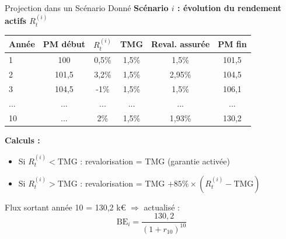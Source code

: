 \documentclass[10pt,aspectratio=169]{beamer}
\newcommand{\BE}{\text{BE}}
\begin{document}
\begin{frame}{Projection dans un Scénario Donné}
\textbf{Scénario $i$ : évolution du rendement actifs $R^{(i)}_t$}

\begin{table}
\centering
\scriptsize
\begin{tabular}{lccccc}
\toprule
\textbf{Année} & \textbf{PM début} & \textbf{$R^{(i)}_t$} & \textbf{TMG} & \textbf{Reval. assurée} & \textbf{PM fin} \\
\midrule
1 & 100 & 0,5\% & 1,5\% & 1,5\% & 101,5 \\
2 & 101,5 & 3,2\% & 1,5\% & 2,95\% & 104,5 \\
3 & 104,5 & -1\% & 1,5\% & 1,5\% & 106,1 \\
... & ... & ... & ... & ... & ... \\
10 & ... & 2\% & 1,5\% & 1,93\% & 130,2 \\
\bottomrule
\end{tabular}
\end{table}

\vspace{0.2cm}
\textbf{Calculs :}
\begin{itemize}
    \item Si $R^{(i)}_t < \text{TMG}$ : revalorisation = TMG (garantie activée)
    \item Si $R^{(i)}_t > \text{TMG}$ : revalorisation = TMG $+ 85\% \times (R^{(i)}_t - \text{TMG})$
\end{itemize}

\vspace{0.2cm}
Flux sortant année 10 = 130,2 k€ $\Rightarrow$ actualisé :
\[
\BE_i = \frac{130,2}{(1+r_{10})^{10}}
\]
\end{frame}
\end{document}
